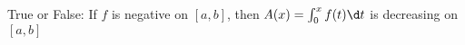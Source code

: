 \documentclass{ximera}
\author{Steven Gubkin}
\begin{document}
\begin{exercise}

True or False:  If $f$ is negative on $[a,b]$, then $A(x) = \int_0^x f(t) \d t$ is decreasing on $[a,b]$


\begin{prompt}
	\begin{multipleChoice}
	\end{multipleChoice}
\end{prompt}

\end{exercise}
\end{document}
